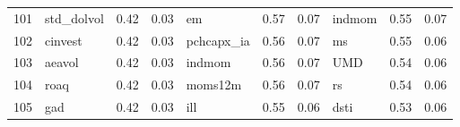 \documentclass[12pt]{article}
\begin{document}
\begin{landscape}
\begin{footnotesize}
\begin{longtable}{l|lcc|lcc|lcc}
			101                   & std\_dolvol                 & 0.42                                                                                 & 0.03                            & em                          & 0.57                                                                                 & 0.07                            & indmom                      & 0.55                                                                                 & 0.07                           \\
			102                   & cinvest                     & 0.42                                                                                 & 0.03                            & pchcapx\_ia                 & 0.56                                                                                 & 0.07                            & ms                          & 0.55                                                                                 & 0.06                           \\
			103                   & aeavol                      & 0.42                                                                                 & 0.03                            & indmom                      & 0.56                                                                                 & 0.07                            & UMD                         & 0.54                                                                                 & 0.06                           \\
			104                   & roaq                        & 0.42                                                                                 & 0.03                            & moms12m                     & 0.56                                                                                 & 0.07                            & rs                          & 0.54                                                                                 & 0.06                           \\
			105                   & gad                         & 0.42                                                                                 & 0.03                            & ill                         & 0.55                                                                                 & 0.06                            & dsti                        & 0.53                                                                                 & 0.06                           \\

\end{longtable}
\end{footnotesize}
\end{landscape}
\end{document}
